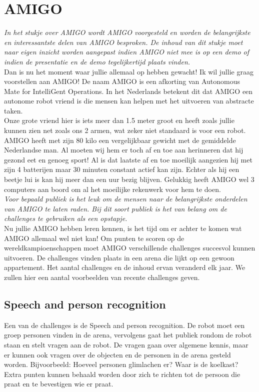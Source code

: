 \documentclass[a4paper,10pt]{article}
\numberwithin{equation}{section}
\numberwithin{figure}{section}
\numberwithin{table}{section}
\begin{document}
\section*{AMIGO}
\textit{In het stukje over AMIGO wordt AMIGO voorgesteld en worden de belangrijkste en interessantste delen van AMIGO besproken. De inhoud van dit stukje moet naar eigen inzicht worden aangepast indien AMIGO niet mee is op een demo of indien de presentatie en de demo tegelijkertijd plaats vinden.}\\


Dan is nu het moment waar jullie allemaal op hebben gewacht! Ik wil jullie graag voorstellen aan AMIGO! De naam AMIGO is een afkorting van Autonomous Mate for IntelliGent Operations. In het Nederlands betekent dit dat AMIGO een autonome robot vriend is die mensen kan helpen met het uitvoeren van abstracte taken. \\

Onze grote vriend hier is iets meer dan 1.5 meter groot en heeft zoals jullie kunnen zien net zoals ons 2 armen, wat zeker niet standaard is voor een robot. AMIGO heeft met zijn 80 kilo een vergelijkbaar gewicht met de gemiddelde Nederlandse man. Al moeten wij hem er toch af en toe aan herinneren dat hij gezond eet en genoeg sport!
Al is dat laatste af en toe moeilijk aangezien hij met zijn 4 batterijen maar 30 minuten constant actief kan zijn. Echter als hij een beetje lui is kan hij meer dan een uur bezig blijven. Gelukkig heeft AMIGO wel 3 computers aan boord om al het moeilijke rekenwerk voor hem te doen.\\

\textit{Voor bepaald publiek is het leuk om de mensen naar de belangrijkste onderdelen van AMIGO te laten raden. Bij dit soort publiek is het van belang om de challenges te gebruiken als een opstapje.}\\

Nu jullie AMIGO hebben leren kennen, is het tijd om er achter te komen wat AMIGO allemaal wel niet kan! Om punten te scoren op de wereldkampioenschappen moet AMIGO verschillende challenges succesvol kunnen uitvoeren. De challenges vinden plaats in een arena die lijkt op een gewoon appartement. Het aantal challenges en de inhoud ervan veranderd elk jaar. We zullen hier een aantal voorbeelden van recente challenges geven.

\subsection*{Speech and person recognition}
Een van de challenges is de Speech and person recognition. De robot moet een groep personen vinden in de arena, vervolgens gaat het publiek rondom de robot staan en stelt vragen aan de robot. De vragen gaan over algemene kennis, maar er kunnen ook vragen over de objecten en de personen in de arena gesteld worden. Bijvoorbeeld: Hoeveel personen glimlachen er? Waar is de koelkast? Extra punten kunnen behaald worden door zich te richten tot de persoon die praat en te bevestigen wie er praat.
\end{document}
